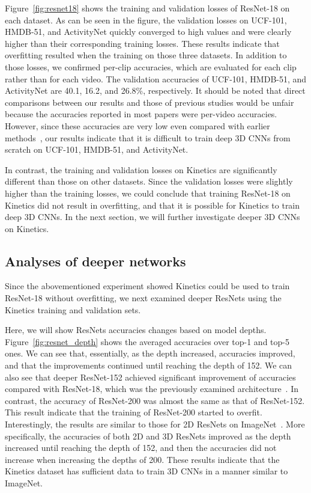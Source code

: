 \documentclass[10pt,twocolumn,letterpaper]{article}
\begin{document}
    Figure~\ref{fig:resnet18} shows the training and validation losses of ResNet-18 on each dataset.
    As can be seen in the figure, the validation losses on UCF-101, HMDB-51, and ActivityNet quickly converged to high values
    and were clearly higher than their corresponding training losses.
    These results indicate that overfitting resulted when the training on those three datasets.
    In addition to those losses, we confirmed per-clip accuracies,
    which are evaluated for each clip rather than for each video.
    The validation accuracies of UCF-101, HMDB-51, and ActivityNet are 40.1, 16.2, and 26.8\%, respectively.
    It should be noted that direct comparisons between our results and those of previous studies would be unfair
    because the accuracies reported in most papers were per-video accuracies.
    However, since these accuracies are very low even compared with earlier methods~\cite{activitynet,Wang2013},
    our results indicate that it is difficult to train deep 3D CNNs from scratch on UCF-101, HMDB-51, and ActivityNet.

    In contrast, the training and validation losses on Kinetics are significantly different than those on other datasets.
    Since the validation losses were slightly higher than the training losses,
    we could conclude that training ResNet-18 on Kinetics did not result in overfitting,
    and that it is possible for Kinetics to train deep 3D CNNs.
    In the next section, we will further investigate deeper 3D CNNs on Kinetics.

  \subsection{Analyses of deeper networks}\label{sec:exp_kinetics}
    Since the abovementioned experiment showed Kinetics could be used to train ResNet-18 without overfitting,
    we next examined deeper ResNets using the Kinetics training and validation sets.
    
    Here, we will show ResNets accuracies changes based on model depths.
    Figure~\ref{fig:resnet_depth} shows the averaged accuracies over top-1 and top-5 ones.
    We can see that, essentially, as the depth increased, accuracies improved,
    and that the improvements continued until reaching the depth of 152.
    We can also see that deeper ResNet-152 achieved significant improvement of accuracies
    compared with ResNet-18, which was the previously examined architecture~\cite{Hara_2017_ICCV_Workshops,res3d}.
In contrast, the accuracy of ResNet-200 was almost the same as that of ResNet-152.
    This result indicate that the training of ResNet-200 started to overfit.
    Interestingly, the results are similar to those for 2D ResNets on ImageNet~\cite{He2016}.
    More specifically, the accuracies of both 2D and 3D ResNets improved as the depth increased until reaching the depth of 152,
    and then the accuracies did not increase when increasing the depths of 200.
    These results indicate that the Kinetics dataset has sufficient data to train 3D CNNs in a manner similar to ImageNet.
\end{document}
